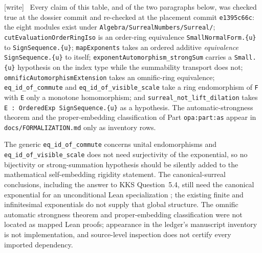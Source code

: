 \documentclass[11pt,a4paper]{article}
\numberwithin{equation}{section}
\theoremstyle{plain}
\theoremstyle{definition}
\theoremstyle{remark}
\newcommand{\code}[1]{\texttt{\small #1}}
\newcommand{\lbl}[1]{\nolinkurl{#1}}%
\newcommand{\fn}[1]{\nolinkurl{#1}}%
\newcommand{\wtag}{\textup{\textsf{[write]}}}%
\newenvironment{wnote}{\par\smallskip\noindent\wtag\ }{\par\smallskip}
\begin{document}
\begin{wnote}
Every claim of this table, and of the two paragraphs below, was checked true at
the dossier commit and re-checked at the placement commit \code{e1395c66c}:
the eight modules exist under \fn{Algebra/SurrealNumbers/Surreal/};
\code{cutEvaluationOrderRingIso} is an order-ring equivalence
\code{SmallNormalForm.\{u\}} to \code{SignSequence.\{u\}};
\code{mapExponents} takes an ordered additive \emph{equivalence}
\code{SignSequence.\{u\}} to itself;
\code{exponentAutomorphism\_strongSum} carries a \code{Small.\{u\}} hypothesis on
the index type while the summability transport does not;
\code{omnificAutomorphismExtension} takes an omnific-ring equivalence;
\code{eq\_id\_of\_commute} and \code{eq\_id\_of\_visible\_scale} take a ring
endomorphism of \code{F} with \code{E} only a monotone homomorphism; and
\code{surreal\_not\_lift\_dilation} takes \code{E : OrderedExp SignSequence.\{u\}}
as a hypothesis. The automatic-strongness theorem and the proper-embedding
classification of Part \lbl{opa:part:as} appear in
\fn{docs/FORMALIZATION.md} only as inventory rows.
\end{wnote}

The generic \code{eq\_id\_of\_commute} concerns unital endomorphisms and
\code{eq\_id\_of\_visible\_scale} does not need surjectivity of the exponential,
so no bijectivity or strong-summation hypothesis should be silently added to the
mathematical self-embedding rigidity statement. The canonical-surreal
conclusions, including the answer to KKS Question~5.4, still need the canonical
exponential for an unconditional Lean specialization
\cite{RepoExp,sr-RepoCode,sr-RepoLedger}; the existing finite and infinitesimal
exponentials do not supply that global structure. The omnific automatic
strongness theorem and proper-embedding classification were not located as
mapped Lean proofs; appearance in the ledger's manuscript inventory is not
implementation, and source-level inspection does not certify every imported
dependency.
\end{document}
